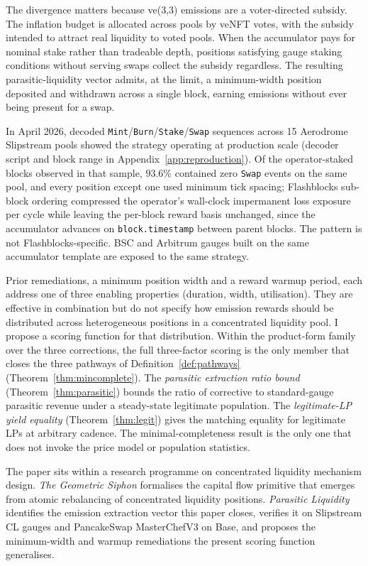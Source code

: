\documentclass[11pt,a4paper]{article}
\theoremstyle{definition}
\theoremstyle{plain}
\theoremstyle{remark}
\begin{document}
The divergence matters because ve(3,3) emissions are a voter-directed subsidy\cite{cronje2022}. The inflation budget is allocated across pools by veNFT votes, with the subsidy intended to attract real liquidity to voted pools. When the accumulator pays for nominal stake rather than tradeable depth, positions satisfying gauge staking conditions without serving swaps collect the subsidy regardless. The resulting parasitic-liquidity vector\cite{ryan2026c} admits, at the limit, a minimum-width position deposited and withdrawn across a single block, earning emissions without ever being present for a swap.

In April 2026, decoded \texttt{Mint}/\texttt{Burn}/\texttt{Stake}/\texttt{Swap} sequences across 15 Aerodrome Slipstream pools showed the strategy operating at production scale (decoder script and block range in Appendix~\ref{app:reproduction}). Of the operator-staked blocks observed in that sample, $93.6\%$ contained zero \texttt{Swap} events on the same pool, and every position except one used minimum tick spacing; Flashblocks sub-block ordering compressed the operator's wall-clock impermanent loss exposure per cycle while leaving the per-block reward basis unchanged, since the accumulator advances on \texttt{block.timestamp} between parent blocks. The pattern is not Flashblocks-specific. BSC and Arbitrum gauges built on the same accumulator template are exposed to the same strategy.

Prior remediations, a minimum position width and a reward warmup period\cite{ryan2026c}, each address one of three enabling properties (duration, width, utilisation). They are effective in combination but do not specify how emission rewards should be distributed across heterogeneous positions in a concentrated liquidity pool. I propose a scoring function for that distribution. Within the product-form family over the three corrections, the full three-factor scoring is the only member that closes the three pathways of Definition~\ref{def:pathways} (Theorem~\ref{thm:mincomplete}). The \emph{parasitic extraction ratio bound} (Theorem~\ref{thm:parasitic}) bounds the ratio of corrective to standard-gauge parasitic revenue under a steady-state legitimate population. The \emph{legitimate-LP yield equality} (Theorem~\ref{thm:legit}) gives the matching equality for legitimate LPs at arbitrary cadence. The minimal-completeness result is the only one that does not invoke the price model or population statistics.

The paper sits within a research programme on concentrated liquidity mechanism design. \emph{The Geometric Siphon}\cite{ryan2026a,ryan2026b} formalises the capital flow primitive that emerges from atomic rebalancing of concentrated liquidity positions. \emph{Parasitic Liquidity}\cite{ryan2026c} identifies the emission extraction vector this paper closes, verifies it on Slipstream CL gauges and PancakeSwap MasterChefV3 on Base, and proposes the minimum-width and warmup remediations the present scoring function generalises.
\end{document}
